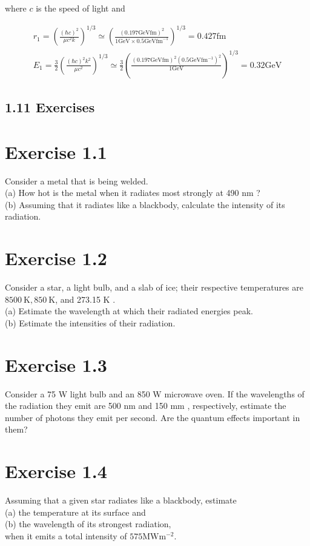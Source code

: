 \documentclass[10pt]{article}
\begin{document}
where $c$ is the speed of light and


\begin{gather*}
r_{1}=\left(\frac{(\hbar c)^{2}}{\mu c^{2} k}\right)^{1 / 3} \simeq\left(\frac{(0.197 \mathrm{GeV} \mathrm{fm})^{2}}{1 \mathrm{GeV} \times 0.5 \mathrm{GeV} \mathrm{fm}^{-1}}\right)^{1 / 3}=0.427 \mathrm{fm}  \tag{1.247}\\
E_{1}=\frac{3}{2}\left(\frac{(\hbar c)^{2} k^{2}}{\mu c^{2}}\right)^{1 / 3} \simeq \frac{3}{2}\left(\frac{(0.197 \mathrm{GeV} \mathrm{fm})^{2}\left(0.5 \mathrm{GeV} \mathrm{fm}^{-1}\right)^{2}}{1 \mathrm{GeV}}\right)^{1 / 3}=0.32 \mathrm{GeV} \tag{1.248}
\end{gather*}


\subsection*{1.11 Exercises}
\section*{Exercise 1.1}
Consider a metal that is being welded.\\
(a) How hot is the metal when it radiates most strongly at 490 nm ?\\
(b) Assuming that it radiates like a blackbody, calculate the intensity of its radiation.

\section*{Exercise 1.2}
Consider a star, a light bulb, and a slab of ice; their respective temperatures are $8500 \mathrm{~K}, 850 \mathrm{~K}$, and 273.15 K .\\
(a) Estimate the wavelength at which their radiated energies peak.\\
(b) Estimate the intensities of their radiation.

\section*{Exercise 1.3}
Consider a 75 W light bulb and an 850 W microwave oven. If the wavelengths of the radiation they emit are 500 nm and 150 mm , respectively, estimate the number of photons they emit per second. Are the quantum effects important in them?

\section*{Exercise 1.4}
Assuming that a given star radiates like a blackbody, estimate\\
(a) the temperature at its surface and\\
(b) the wavelength of its strongest radiation,\\
when it emits a total intensity of $575 \mathrm{MW} \mathrm{m}{ }^{-2}$.
\end{document}
